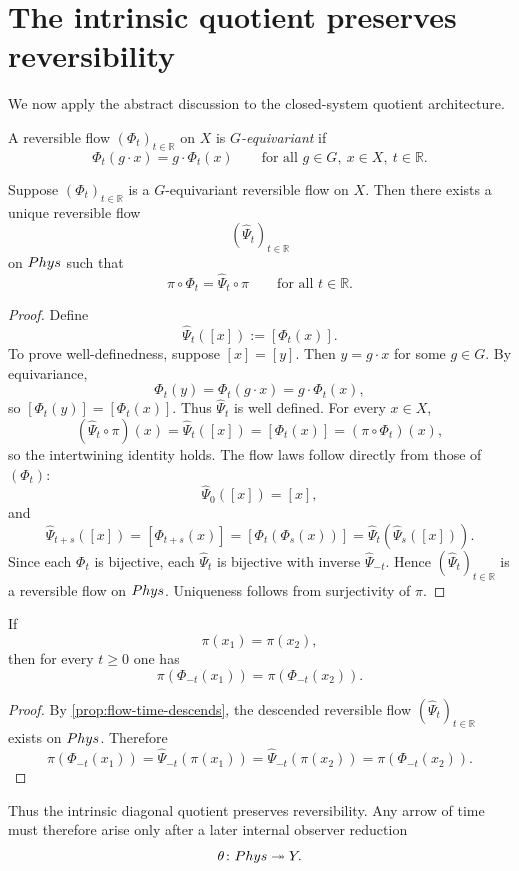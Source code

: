\section{The intrinsic quotient preserves reversibility}
We now apply the abstract discussion to the closed-system quotient
architecture.
\begin{definition}
	A reversible flow \((\Phi_t)_{t\in\mathbb R}\) on \(X\) is
	\emph{\(G\)-equivariant} if
	\[
		\Phi_t(g\cdot x)=g\cdot\Phi_t(x)
		\qquad
		\text{for all }g\in G,\ x\in X,\ t\in\mathbb R.
	\]
\end{definition}
\begin{proposition}
	\label{prop:flow-time-descends}
	Suppose \((\Phi_t)_{t\in\mathbb R}\) is a \(G\)-equivariant reversible
	flow on \(X\). Then there exists a unique reversible flow
	\[
		(\widehat\Psi_t)_{t\in\mathbb R}
	\]
	on \(Phys\) such that
	\[
		\pi\circ\Phi_t=\widehat\Psi_t\circ\pi
		\qquad
		\text{for all }t\in\mathbb R.
	\]
\end{proposition}
\begin{proof}
	Define
	\[
		\widehat\Psi_t([x]):=[\Phi_t(x)].
	\]
	To prove well-definedness, suppose \([x]=[y]\). Then \(y=g\cdot x\) for
	some \(g\in G\). By equivariance,
	\[
		\Phi_t(y)=\Phi_t(g\cdot x)=g\cdot\Phi_t(x),
	\]
	so \([\Phi_t(y)]=[\Phi_t(x)]\). Thus \(\widehat\Psi_t\) is well defined.
	For every \(x\in X\),
	\[
		(\widehat\Psi_t\circ\pi)(x)=\widehat\Psi_t([x])=[\Phi_t(x)]
		=
		(\pi\circ\Phi_t)(x),
	\]
	so the intertwining identity holds.
	The flow laws follow directly from those of \((\Phi_t)\):
	\[
		\widehat\Psi_0([x])=[x],
	\]
	and
	\[
		\widehat\Psi_{t+s}([x])
		=
		[\Phi_{t+s}(x)]
		=
		[\Phi_t(\Phi_s(x))]
		=
		\widehat\Psi_t(\widehat\Psi_s([x])).
	\]
	Since each \(\Phi_t\) is bijective, each \(\widehat\Psi_t\) is bijective
	with inverse \(\widehat\Psi_{-t}\). Hence
	\((\widehat\Psi_t)_{t\in\mathbb R}\) is a reversible flow on \(Phys\).
	Uniqueness follows from surjectivity of \(\pi\).
\end{proof}
\begin{corollary}
	If
	\[
		\pi(x_1)=\pi(x_2),
	\]
	then for every \(t\ge0\) one has
	\[
		\pi(\Phi_{-t}(x_1))=\pi(\Phi_{-t}(x_2)).
	\]
\end{corollary}
\begin{proof}
	By \cref{prop:flow-time-descends}, the descended reversible flow
	\((\widehat\Psi_t)_{t\in\mathbb R}\) exists on \(Phys\). Therefore
	\[
		\pi(\Phi_{-t}(x_1))
		=
		\widehat\Psi_{-t}(\pi(x_1))
		=
		\widehat\Psi_{-t}(\pi(x_2))
		=
		\pi(\Phi_{-t}(x_2)).
	\]
\end{proof}
Thus the intrinsic diagonal quotient preserves reversibility.
Any arrow of time must therefore arise only after a later internal
observer reduction
\[
	\theta\colon Phys\twoheadrightarrow Y.
\]
